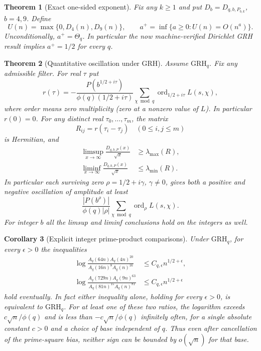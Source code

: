 \documentclass[11pt]{article}
\newtheorem{theorem}{Theorem}
\newtheorem{corollary}[theorem]{Corollary}
\theoremstyle{definition}\newtheorem{definition}[theorem]{Definition}
\newcommand{\ord}{\operatorname{ord}}
\newcommand{\GRH}{\mathrm{GRH}}
\begin{document}
\begin{theorem}[Exact one-sided exponent]\label{thm:exponent}
Fix any $k\ge1$ and put $D_b=D_{q,b,P_{b,k}}$, $b=4,9$. Define
\[
 U(n)=\max\{0,D_4(n),D_9(n)\},\qquad
 a^+=\inf\{a\ge0: U(n)=O(n^a)\}.
\]
Unconditionally, $a^+=\Theta_q$. In particular the now machine-verified Dirichlet GRH result implies $a^+=1/2$ for every $q$.
\end{theorem}

\begin{theorem}[Quantitative oscillation under GRH]\label{thm:osc}
Assume $\GRH_q$. Fix any admissible filter. For real $\tau$ put
\[
 r(\tau)=-\frac{P(b^{1/2+i\tau})}{\phi(q)(1/2+i\tau)}\sum_{\chi\bmod q}\ord_{1/2+i\tau}L(s,\chi),
\]
where order means zero multiplicity (zero at a nonzero value of $L$). In particular $r(0)=0$. For any distinct real $\tau_0,\ldots,\tau_m$, the matrix
\[
 R_{ij}=r(\tau_i-\tau_j)\quad(0\le i,j\le m)
\]
is Hermitian, and
\begin{align*}
 \limsup_{x\to\infty}\frac{D_{q,b,P}(x)}{\sqrt x}&\ge\lambda_{\max}(R),\\
 \liminf_{x\to\infty}\frac{D_{q,b,P}(x)}{\sqrt x}&\le\lambda_{\min}(R).
\end{align*}
In particular each surviving zero $\rho=1/2+i\gamma$, $\gamma\ne0$, gives both a positive and negative oscillation of amplitude at least
\[
 \frac{|P(b^\rho)|}{\phi(q)|\rho|}\sum_{\chi\bmod q}\ord_\rho L(s,\chi).
\]
For integer $b$ all the limsup and liminf conclusions hold on the integers as well.
\end{theorem}

\begin{corollary}[Explicit integer prime-product comparisons]\label{cor:products}
Under $\GRH_q$, for every $\epsilon>0$ the inequalities
\begin{align*}
 \log\frac{A_q(64n) A_q(4n)^{20}}{A_q(16n)^8 A_q(n)^{16}}&\le C_{q,\epsilon} n^{1/2+\epsilon},\\
 \log\frac{A_q(729n) A_q(9n)^{63}}{A_q(81n)^{15} A_q(n)^{81}}&\le C_{q,\epsilon} n^{1/2+\epsilon}
\end{align*}
hold eventually. In fact either inequality alone, holding for every $\epsilon>0$, is equivalent to $\GRH_q$. For at least one of these two ratios, the logarithm exceeds $c\sqrt n/\phi(q)$ and is less than $-c\sqrt n/\phi(q)$ infinitely often, for a single absolute constant $c>0$ and a choice of base independent of $q$. Thus even after cancellation of the prime-square bias, neither sign can be bounded by $o(\sqrt n)$ for that base.
\end{corollary}
\end{document}
